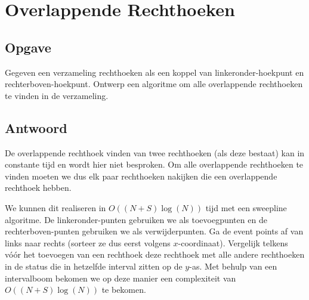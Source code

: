 \documentclass[examenvragen.tex]{subfiles}
\begin{document}
\section{Overlappende Rechthoeken}
\subsection{Opgave}
Gegeven een verzameling rechthoeken als een koppel van linkeronder-hoekpunt en rechterboven-hoekpunt. Ontwerp een algoritme om alle overlappende rechthoeken te vinden in de verzameling.

\subsection{Antwoord}
De overlappende rechthoek vinden van twee rechthoeken (als deze bestaat) kan in constante tijd en wordt hier niet besproken.
Om alle overlappende rechthoeken te vinden moeten we dus elk paar rechthoeken nakijken die een overlappende rechthoek hebben.

We kunnen dit realiseren in $O((N+S)\log(N))$ tijd met een sweepline algoritme. De linkeronder-punten gebruiken we als toevoegpunten en de rechterboven-punten gebruiken we als verwijderpunten. Ga de event points af van links naar rechts (sorteer ze dus eerst volgens $x$-coordinaat). Vergelijk telkens v\'o\'or het toevoegen van een rechthoek deze rechthoek met alle andere rechthoeken in de status die in hetzelfde interval zitten op de $y$-as. Met behulp van een intervalboom bekomen we op deze manier een complexiteit van $O((N+S)\log(N))$ te bekomen.
\end{document}
